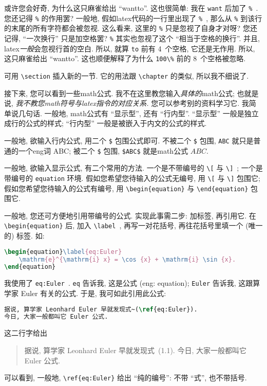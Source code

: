 或许您会好奇, 为什么这只麻雀给出 ``wantto''.
这也很简单: 我在 \verb`want` 后加了 \verb`%`~.
您还记得 \verb`%` 的作用罢?
一般地, 假如\gls{latex}代码的一行里出现了 \verb`%`~,
那么从 \verb`%` 到该行的末尾的所有字符都会被忽视.
这么看来, 这里的 \verb`%` 只是忽视了自身才对呀?
您还记得, ``一次换行'' 只是加空格罢?
\verb`%` 其实也忽视了这个 ``相当于空格的换行''.
并且, \gls{latex}\emph{一般}会忽视行首的空白.
所以, 就算 \verb`to` 前有 4~个空格, 它还是无作用.
所以, 这只麻雀给出 ``wantto''.
这也顺便解释了为什么 \verb`100\%` 前的 8~个空格被忽略.

可用 \verb`\section` 插入新的一节.
它的用法跟 \verb`\chapter` 的类似, 所以我不细说了.

接下来, 您可以看到一些\gls{math}公式.
我不在这里教您输入\emph{具体的}\gls{math}公式;
也就是说,
\emph{我不教您\gls{math}符号与\gls{latex}指令的对应关系.}
您可以参考别的资料学习它.
我简单说几句话.
一般地, \gls{math}公式有 ``显示型'', 还有 ``行内型''.
``显示型'' 一般是独立成行的公式的样式;
``行内型'' 一般是被嵌入于内文的公式的样式.

一般地, 欲输入行内公式,
用二个 \verb`$` 包围公式即可.
不被二个 \verb`$` 包围,
\verb`ABC` 就只是普通的一个\gls{eng}词 ABC;
被二个 \verb`$` 包围,
\verb`$ABC$` 就是\gls{math}公式 $ABC$.

一般地, 欲输入显示公式, 有二个常用的方法.
一个是不带编号的 \verb`\[` 与 \verb`\]`~;
一个是带编号的 \verb`equation` 环境.
假如您希望您待输入的公式无编号,
用 \verb`\[` 与 \verb`\]` 包围它;
假如您希望您待输入的公式有编号,
用 \verb`\begin{equation}` 与 \verb`\end{equation}` 包围它.

一般地, 您还可方便地引用带编号的公式.
实现此事需二步: 加标签, 再引用它.
在 \verb`\begin{equation}` 后, 加入 \verb`\label`~,
再写一对花括号, 再往花括号里填一个 (唯一的) 标签.
如:
\begin{lstlisting}[language=TeX]
\begin{equation}\label{eq:Euler}
    \mathrm{e}^{\mathrm{i} x} = \cos {x} + \mathrm{i} \sin {x}.
\end{equation}
\end{lstlisting}
我使用了 \verb`eq:Euler`~.
\verb`eq` 告诉我, 这是公式 (\gls{eng}: equation);
\verb`Euler` 告诉我, 这跟算学家 Euler 有关的公式.
于是, 我可如此引用此公式:
\begin{lstlisting}[language=TeX]
据说, 算学家 Leonhard Euler 早就发现式~(\ref{eq:Euler}).
今日, 大家一般都叫它 Euler 公式.
\end{lstlisting}
这二行字给出
\begin{quotation}
    据说, 算学家 Leonhard Euler 早就发现式~(1.1).
    今日, 大家一般都叫它 Euler 公式.
\end{quotation}
可以看到, 一般地,
\verb`\ref{eq:Euler}` 给出 ``纯的编号'':
不带 ``式'', 也不带括号.

